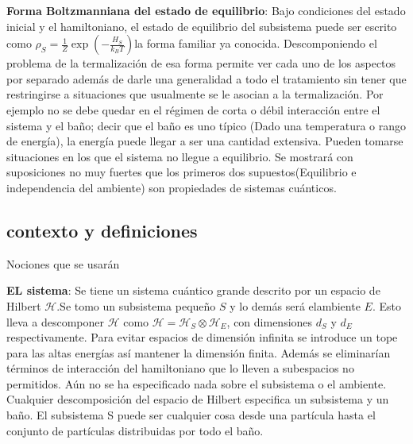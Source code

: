 \textbf{Forma Boltzmanniana del estado de equilibrio}: Bajo condiciones del estado inicial y el hamiltoniano, el estado de equilibrio del subsistema puede ser escrito como $\rho_{S}= \frac{1}{Z} \exp(-\frac{H_{S}}{k_{B}T})$la forma familiar ya conocida.
Descomponiendo el problema de la termalización de esa forma permite ver cada uno de los aspectos por separado además de darle una generalidad a todo el tratamiento sin tener que restringirse a situaciones que usualmente se le asocian a la termalización. Por ejemplo no se debe quedar en el régimen de corta o débil interacción entre el sistema y el baño; decir que el baño es uno típico (Dado una temperatura o rango de energía), la energía puede llegar a ser una cantidad extensiva. Pueden tomarse situaciones en los que el sistema no llegue a equilibrio.
Se mostrará con suposiciones no muy fuertes que los primeros dos supuestos(Equilibrio e independencia del ambiente) son propiedades de sistemas cuánticos.

\subsection{contexto y definiciones}
Nociones que se usarán

\textbf{EL sistema}: Se tiene un sistema cuántico grande descrito por un espacio de Hilbert $\mathcal{H}$.Se tomo un subsistema pequeño $S$ y lo demás será elambiente $E$. Esto lleva a descomponer $\mathcal{H}$ como $\mathcal{H}=\mathcal{H}_{S} \otimes \mathcal{H}_{E}$, con dimensiones $d_{S}$ y $d_{E}$ respectivamente. Para evitar espacios de dimensión infinita se introduce un tope para las altas energías así mantener la dimensión finita. Además se eliminarían términos de interacción del hamiltoniano que lo lleven a subespacios no permitidos. Aún no se ha especificado nada sobre el subsistema o el ambiente. Cualquier descomposición del espacio de Hilbert especifica un subsistema y un baño. El subsistema S puede ser cualquier cosa desde una partícula hasta el conjunto de partículas distribuidas por todo el baño.

